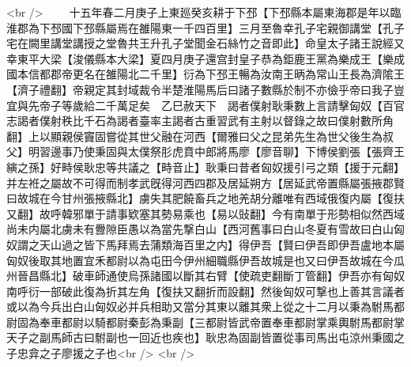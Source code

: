 <br />
　　十五年春二月庚子上東廵癸亥耕于下邳【下邳縣本屬東海郡是年以臨淮郡為下邳國下邳縣屬焉在雒陽東一千四百里】三月至魯幸孔子宅親御講堂【孔子宅在闕里講堂講授之堂魯共王升孔子堂聞金石絲竹之音即此】命皇太子諸王說經又幸東平大梁【浚儀縣本大梁】夏四月庚子還宫封皇子恭為鉅鹿王黨為樂成王【樂成國本信都郡帝更名在雒陽北二千里】衍為下邳王暢為汝南王昞為常山王長為濟隂王【濟子禮翻】帝親定其封域裁令半楚淮陽馬后曰諸子數縣於制不亦儉乎帝曰我子豈宜與先帝子等歲給二千萬足矣　乙巳赦天下　謁者僕射耿秉數上言請擊匈奴【百官志謁者僕射秩比千石為謁者臺率主謁者古重習武有主射以督錄之故曰僕射數所角翻】上以顯親侯竇固嘗從其世父融在河西【爾雅曰父之昆弟先生為世父後生為叔父】明習邊事乃使秉固與太僕祭肜虎賁中郎將馬廖【廖音聊】下博侯劉張【張齊王縯之孫】好畤侯耿忠等共議之【畤音止】耿秉曰昔者匈奴援引弓之類【援于元翻】并左袵之屬故不可得而制孝武旣得河西四郡及居延朔方【居延武帝置縣屬張掖郡賢曰故城在今甘州張掖縣北】虜失其肥饒畜兵之地羌胡分離唯有西域俄復内屬【復扶又翻】故呼韓邪單于請事欵塞其勢易乘也【易以䜴翻】今有南單于形勢相似然西域尚未内屬北虜未有釁隙臣愚以為當先撃白山【西河舊事曰白山冬夏有雪故曰白山匈奴謂之天山過之皆下馬拜焉去蒲類海百里之内】得伊吾【賢曰伊吾即伊吾盧地本屬匈奴後取其地置宜禾都尉以為屯田今伊州細職縣伊吾故城是也又曰伊吾故城在今瓜州晉昌縣北】破車師通使烏孫諸國以斷其右臂【使疏吏翻斷丁管翻】伊吾亦有匈奴南呼衍一部破此復為折其左角【復扶又翻折而設翻】然後匈奴可撃也上善其言議者或以為今兵出白山匈奴必并兵相助又當分其東以離其衆上從之十二月以秉為駙馬都尉固為奉車都尉以騎都尉秦彭為秉副【三都尉皆武帝置奉車都尉掌乘輿駙馬都尉掌天子之副馬師古曰駙副也一回近也疾也】耿忠為固副皆置從事司馬出屯涼州秉國之子忠弇之子廖援之子也<br />
<br />
